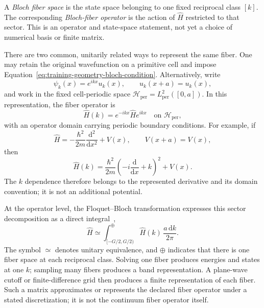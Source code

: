 A \emph{Bloch fiber space} is the state space belonging to one fixed reciprocal
class $[k]$. The corresponding \emph{Bloch-fiber operator} is the action of
$\widehat H$ restricted to that sector. This is an operator and state-space
statement, not yet a choice of numerical basis or finite matrix.

There are two common, unitarily related ways to represent the same fiber. One
may retain the original wavefunction on a primitive cell and impose
Equation~\eqref{eq:training-geometry-bloch-condition}. Alternatively, write
\begin{equation}
  \psi_k(x)=e^{ikx}u_k(x),
  \qquad
  u_k(x+a)=u_k(x),
  \label{eq:training-geometry-bloch-factorization}
\end{equation}
and work in the fixed cell-periodic space
$\mathcal H_{\mathrm{per}}=L^2_{\mathrm{per}}([0,a])$. In this representation,
the fiber operator is
\begin{equation}
  \widehat H(k)
  =e^{-ikx}\widehat H e^{ikx}
  \quad\text{on }\mathcal H_{\mathrm{per}},
  \label{eq:training-geometry-fiber-definition}
\end{equation}
with an operator domain carrying periodic boundary conditions. For example,
if
\begin{equation}
  \widehat H
  =-\frac{\hbar^2}{2m}\frac{\mathrm d^2}{\mathrm d x^2}+V(x),
  \qquad V(x+a)=V(x),
\end{equation}
then
\begin{equation}
  \widehat H(k)
  =\frac{\hbar^2}{2m}
   \left(-i\frac{\mathrm d}{\mathrm d x}+k\right)^2+V(x).
  \label{eq:training-geometry-schrodinger-fiber}
\end{equation}
The $k$ dependence therefore belongs to the represented derivative and its
domain convention; it is not an additional potential.

At the operator level, the Floquet--Bloch transformation expresses this
sector decomposition as a direct integral~\cite{kuchment2016},
\begin{equation}
  \widehat H
  \simeq
  \int_{[-G/2,G/2)}^{\oplus}
    \widehat H(k)\,\frac{a\,\mathrm d k}{2\pi}.
  \label{eq:training-geometry-direct-integral}
\end{equation}
The symbol $\simeq$ denotes unitary equivalence, and $\oplus$ indicates that
there is one fiber space at each reciprocal class. Solving one fiber produces
energies and states at one $k$; sampling many fibers produces a band
representation. A plane-wave cutoff or finite-difference grid then produces a
finite representation of each fiber. Such a matrix approximates or represents
the declared fiber operator under a stated discretization; it is not the
continuum fiber operator itself.

